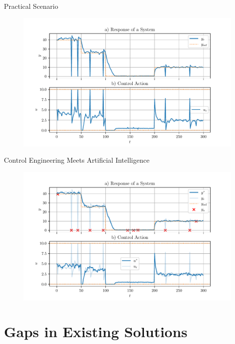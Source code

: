 \documentclass[aspectratio=169]{beamer}
\begin{document}
\begin{frame}{Practical Scenario}
    \begin{figure}[htpb]
        \begin{center}
            \includegraphics[width=0.75\linewidth]{../ilustrate/pc2023/real.pdf}
        \end{center}
    \end{figure}
\end{frame}

\begin{frame}{Control Engineering Meets Artificial Intelligence}
    \begin{figure}[htpb]
        \begin{center}
            \includegraphics[width=0.75\linewidth]{../ilustrate/pc2023/imagined.pdf}
        \end{center}
    \end{figure}
\end{frame}


\section{Gaps in Existing Solutions}
\end{document}
